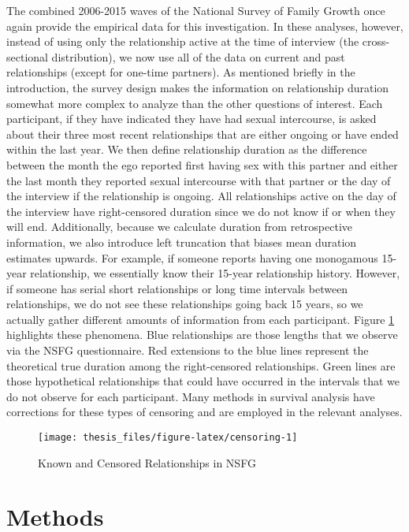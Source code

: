 \documentclass [11pt, proquest] {uwthesis}[2015/03/03]
\begin{document}
The combined 2006-2015 waves of the National Survey of Family Growth once again provide the empirical data for this investigation. In these analyses, however, instead of using only the relationship active at the time of interview (the cross-sectional distribution), we now use all of the data on current and past relationships (except for one-time partners). As mentioned briefly in the introduction, the survey design makes the information on relationship duration somewhat more complex to analyze than the other questions of interest. Each participant, if they have indicated they have had sexual intercourse, is asked about their three most recent relationships that are either ongoing or have ended within the last year. We then define relationship duration as the difference between the month the ego reported first having sex with this partner and either the last month they reported sexual intercourse with that partner or the day of the interview if the relationship is ongoing. All relationships active on the day of the interview have right-censored duration since we do not know if or when they will end. Additionally, because we calculate duration from retrospective information, we also introduce left truncation that biases mean duration estimates upwards. For example, if someone reports having one monogamous 15-year relationship, we essentially know their 15-year relationship history. However, if someone has serial short relationships or long time intervals between relationships, we do not see these relationships going back 15 years, so we actually gather different amounts of information from each participant. Figure \ref{fig:censoring} highlights these phenomena. Blue relationships are those lengths that we observe via the NSFG questionnaire. Red extensions to the blue lines represent the theoretical true duration among the right-censored relationships. Green lines are those hypothetical relationships that could have occurred in the intervals that we do not observe for each participant. Many methods in survival analysis have corrections for these types of censoring and are employed in the relevant analyses.
\begin{figure}

{\centering \texttt{[image: thesis\_files/figure-latex/censoring-1]} 

}

\caption{Known and Censored Relationships in NSFG}\label{fig:censoring}
\end{figure}
\hypertarget{methods}{%
\section{Methods}\label{methods}}
\end{document}
